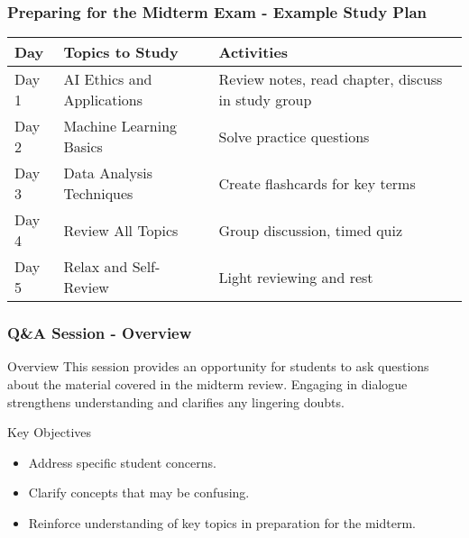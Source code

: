 \documentclass{beamer}
\begin{document}
\begin{frame}[fragile]
    \frametitle{Preparing for the Midterm Exam - Example Study Plan}
    \begin{table}[h!]
        \centering
        \begin{tabular}{|l|l|l|}
            \hline
            \textbf{Day} & \textbf{Topics to Study} & \textbf{Activities} \\
            \hline
            Day 1 & AI Ethics and Applications  & Review notes, read chapter, discuss in study group \\
            Day 2 & Machine Learning Basics     & Solve practice questions \\
            Day 3 & Data Analysis Techniques    & Create flashcards for key terms \\
            Day 4 & Review All Topics          & Group discussion, timed quiz \\
            Day 5 & Relax and Self-Review      & Light reviewing and rest \\
            \hline
        \end{tabular}
    \end{table}
\end{frame}

\begin{frame}[fragile]
    \frametitle{Q\&A Session - Overview}
    \begin{block}{Overview}
        This session provides an opportunity for students to ask questions about the material covered in the midterm review. Engaging in dialogue strengthens understanding and clarifies any lingering doubts.
    \end{block}

    \begin{block}{Key Objectives}
        \begin{itemize}
            \item Address specific student concerns.
            \item Clarify concepts that may be confusing.
            \item Reinforce understanding of key topics in preparation for the midterm.
        \end{itemize}
    \end{block}
\end{frame}
\end{document}

